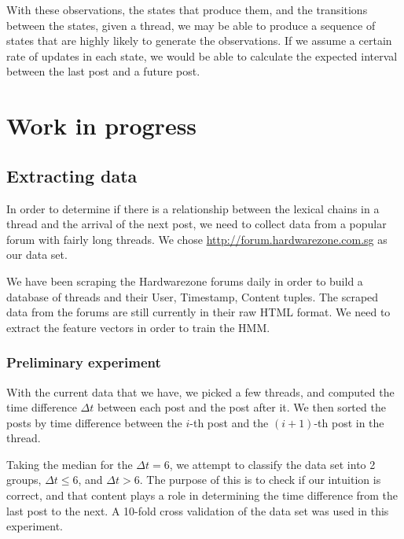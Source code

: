 \documentclass[12 pt]{article}
\begin{document}

With these observations, the states that produce them, and the transitions between the states, given a thread, we may be able to produce a sequence of states that are highly likely to generate the observations. If we assume a certain rate of updates in each state, we would be able to calculate the expected interval between the last post and a future post.


\section{Work in progress}
\subsection{Extracting data}
In order to determine if there is a relationship between the lexical chains in a thread and the arrival of the next post, we need to collect data from a popular forum with fairly long threads. We chose \url{http://forum.hardwarezone.com.sg} as our data set.

We have been scraping the Hardwarezone forums daily in order to build a database of threads and their User, Timestamp, Content tuples. The scraped data from the forums are still currently in their raw HTML format. We need to extract the feature vectors in order to train the HMM.

\subsubsection{Preliminary experiment}
With the current data that we have, we picked a few threads, and computed the time difference $\Delta t$ between each post and the post after it. We then sorted the posts by time difference between the $i$-th post and the $(i + 1)$-th post in the thread.

Taking the median for the $\Delta t = 6$, we attempt to classify the data set into 2 groups, $\Delta t \leq 6$, and $\Delta t > 6$. The purpose of this is to check if our intuition is correct, and that content plays a role in determining the time difference from the last post to the next. A 10-fold cross validation of the data set was used in this experiment.
\end{document}
